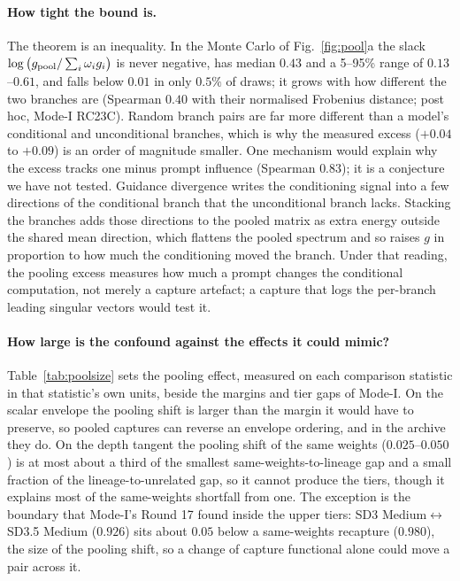 \documentclass[11pt]{article}
\theoremstyle{definition}
\begin{document}
\paragraph{How tight the bound is.} The theorem is an inequality. In the Monte Carlo of Fig.~\ref{fig:pool}a the slack $\log\big(g_{\rm pool}/\sum_i\omega_ig_i\big)$ is never negative, has median $0.43$ and a 5--95\% range of $0.13$--$0.61$, and falls below $0.01$ in only $0.5\%$ of draws; it grows with how different the two branches are (Spearman $0.40$ with their normalised Frobenius distance; post hoc, Mode-I RC23C). Random branch pairs are far more different than a model's conditional and unconditional branches, which is why the measured excess ($+0.04$ to $+0.09$) is an order of magnitude smaller. One mechanism would explain why the excess tracks one minus prompt influence (Spearman $0.83$); it is a conjecture we have not tested. Guidance divergence writes the conditioning signal into a few directions of the conditional branch that the unconditional branch lacks. Stacking the branches adds those directions to the pooled matrix as extra energy outside the shared mean direction, which flattens the pooled spectrum and so raises $g$ in proportion to how much the conditioning moved the branch. Under that reading, the pooling excess measures how much a prompt changes the conditional computation, not merely a capture artefact; a capture that logs the per-branch leading singular vectors would test it.

\paragraph{How large is the confound against the effects it could mimic?} Table~\ref{tab:poolsize} sets the pooling effect, measured on each comparison statistic in that statistic's own units, beside the margins and tier gaps of Mode-I. On the scalar envelope the pooling shift is larger than the margin it would have to preserve, so pooled captures can reverse an envelope ordering, and in the archive they do. On the depth tangent the pooling shift of the same weights ($0.025$--$0.050$) is at most about a third of the smallest same-weights-to-lineage gap and a small fraction of the lineage-to-unrelated gap, so it cannot produce the tiers, though it explains most of the same-weights shortfall from one. The exception is the boundary that Mode-I's Round 17 found inside the upper tiers: SD3 Medium$\leftrightarrow$SD3.5 Medium ($0.926$) sits about $0.05$ below a same-weights recapture ($0.980$), the size of the pooling shift, so a change of capture functional alone could move a pair across it.
\end{document}
